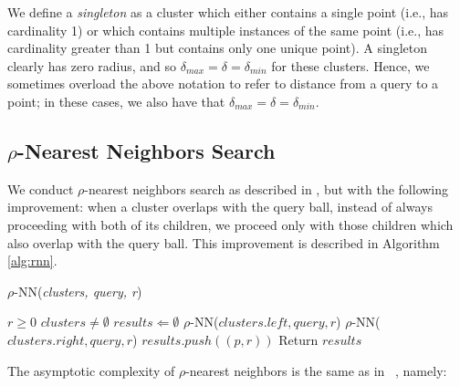 We define a \emph{singleton} as a cluster which either contains a single point (i.e., has cardinality 1) or which contains 
multiple instances of the same point (i.e., has cardinality greater than 1 but contains only one unique point). A singleton clearly 
has zero radius, and so $\delta_{max}  = \delta = \delta_{min}$ for these clusters. Hence, we sometimes overload the above 
notation to refer to distance from a query to a point; in these cases, we also have that $\delta_{max} = \delta = \delta_{min}$.

\subsection{\texorpdfstring{$\rho$}{p}-Nearest Neighbors Search}
\label{subsec:methods:rnn-search}

We conduct $\rho$-nearest neighbors search as described in \cite{ishaq2019clustered}, but 
with the following improvement: when a cluster overlaps with the query ball, instead of  
always proceeding with both of its children, we proceed only with those children which 
also overlap with the query ball. This improvement is described in Algorithm \ref{alg:rnn}.

\begin{algorithm} 
    \caption{$\rho$-NN(\emph{clusters, query, r})} 
    \label{alg:rnn} 
    \begin{algorithmic}
        \REQUIRE $r \geq 0$
        \REQUIRE $clusters \neq \emptyset$
        \STATE $results \Leftarrow \emptyset$
                \STATE $\rho$-NN($clusters.left, query, r$)
            \ENDIF
        \ENDIF
                \STATE $\rho$-NN($clusters.right, query, r$)
            \ENDIF
        \ENDIF
                    \STATE $results.push((p, r))$
                \ENDIF
            \ENDFOR
        \ENDIF
        \STATE Return $results$
    \end{algorithmic}
    \end{algorithm}


The asymptotic complexity of $\rho$-nearest neighbors is the same as in ~\cite{ishaq2019clustered}, namely:

